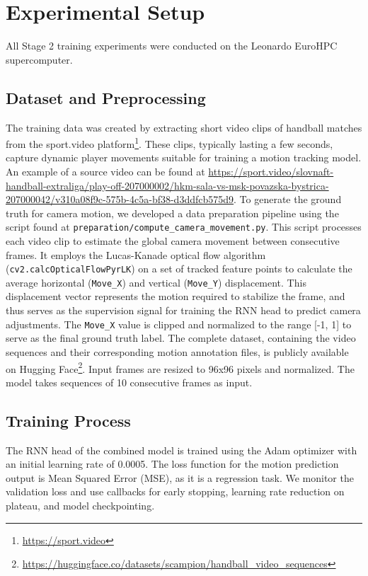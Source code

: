 \documentclass{article}
\begin{document}
\section{Experimental Setup}
All Stage 2 training experiments were conducted on the Leonardo EuroHPC supercomputer.
\subsection{Dataset and Preprocessing}
The training data was created by extracting short video clips of handball matches from the sport.video platform\footnote{\url{https://sport.video}}.
These clips, typically lasting a few seconds, capture dynamic player movements suitable for training a motion tracking model.
An example of a source video can be found at \url{https://sport.video/slovnaft-handball-extraliga/play-off-207000002/hkm-sala-vs-msk-povazska-bystrica-207000042/v310a08f9c-575b-4c5a-bf38-d3ddfcb575d9}.
To generate the ground truth for camera motion, we developed a data preparation pipeline using the script found at \texttt{preparation/compute\_camera\_movement.py}.
This script processes each video clip to estimate the global camera movement between consecutive frames.
It employs the Lucas-Kanade optical flow algorithm (\texttt{cv2.calcOpticalFlowPyrLK}) on a set of tracked feature points to calculate the average horizontal (\texttt{Move\_X}) and vertical (\texttt{Move\_Y}) displacement.
This displacement vector represents the motion required to stabilize the frame, and thus serves as the supervision signal for training the RNN head to predict camera adjustments.
The \texttt{Move\_X} value is clipped and normalized to the range [-1, 1] to serve as the final ground truth label.
The complete dataset, containing the video sequences and their corresponding motion annotation files, is publicly available on Hugging Face\footnote{\url{https://huggingface.co/datasets/scampion/handball_video_sequences}}.
Input frames are resized to 96x96 pixels and normalized. The model takes sequences of 10 consecutive frames as input.

\subsection{Training Process}
The RNN head of the combined model is trained using the Adam optimizer with an initial learning rate of 0.0005.
The loss function for the motion prediction output is Mean Squared Error (MSE), as it is a regression task.
We monitor the validation loss and use callbacks for early stopping, learning rate reduction on plateau, and model checkpointing.
\end{document}
